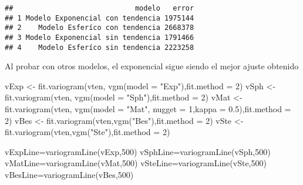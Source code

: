 \documentclass[
  12pt,
]{article}
\newenvironment{Shaded}{\begin{snugshade}}{\end{snugshade}}
\newcommand{\AttributeTok}[1]{\textcolor[rgb]{0.77,0.63,0.00}{#1}}
\newcommand{\DecValTok}[1]{\textcolor[rgb]{0.00,0.00,0.81}{#1}}
\newcommand{\FloatTok}[1]{\textcolor[rgb]{0.00,0.00,0.81}{#1}}
\newcommand{\FunctionTok}[1]{\textcolor[rgb]{0.00,0.00,0.00}{#1}}
\newcommand{\NormalTok}[1]{#1}
\newcommand{\OtherTok}[1]{\textcolor[rgb]{0.56,0.35,0.01}{#1}}
\newcommand{\StringTok}[1]{\textcolor[rgb]{0.31,0.60,0.02}{#1}}
\begin{document}
\begin{verbatim}
##                             modelo   error
## 1 Modelo Exponencial con tendencia 1975144
## 2    Modelo Esferíco con tendencia 2668378
## 3 Modelo Exponencial sin tendencia 1791466
## 4    Modelo Esferíco sin tendencia 2223258
\end{verbatim}

Al probar con otros modelos, el exponencial sigue siendo el mejor ajuste
obtenido

\begin{Shaded}
\begin{Highlighting}[]
\NormalTok{vExp }\OtherTok{\textless{}{-}} \FunctionTok{fit.variogram}\NormalTok{(vten, }\FunctionTok{vgm}\NormalTok{(}\AttributeTok{model =} \StringTok{"Exp"}\NormalTok{),}\AttributeTok{fit.method =} \DecValTok{2}\NormalTok{)}
\NormalTok{vSph }\OtherTok{\textless{}{-}} \FunctionTok{fit.variogram}\NormalTok{(vten, }\FunctionTok{vgm}\NormalTok{(}\AttributeTok{model =} \StringTok{"Sph"}\NormalTok{),}\AttributeTok{fit.method =} \DecValTok{2}\NormalTok{)}
\NormalTok{vMat }\OtherTok{\textless{}{-}} \FunctionTok{fit.variogram}\NormalTok{(vten, }\FunctionTok{vgm}\NormalTok{(}\AttributeTok{model =} \StringTok{"Mat"}\NormalTok{, }\AttributeTok{nugget =} \DecValTok{1}\NormalTok{,}\AttributeTok{kappa =} \FloatTok{0.5}\NormalTok{),}\AttributeTok{fit.method =} \DecValTok{2}\NormalTok{)}
\NormalTok{vBes }\OtherTok{\textless{}{-}} \FunctionTok{fit.variogram}\NormalTok{(vten,}\FunctionTok{vgm}\NormalTok{(}\StringTok{"Bes"}\NormalTok{),}\AttributeTok{fit.method =} \DecValTok{2}\NormalTok{)}
\NormalTok{vSte }\OtherTok{\textless{}{-}} \FunctionTok{fit.variogram}\NormalTok{(vten,}\FunctionTok{vgm}\NormalTok{(}\StringTok{"Ste"}\NormalTok{),}\AttributeTok{fit.method =} \DecValTok{2}\NormalTok{)}


\NormalTok{vExpLine}\OtherTok{=}\FunctionTok{variogramLine}\NormalTok{(vExp,}\DecValTok{500}\NormalTok{)}
\NormalTok{vSphLine}\OtherTok{=}\FunctionTok{variogramLine}\NormalTok{(vSph,}\DecValTok{500}\NormalTok{)}
\NormalTok{vMatLine}\OtherTok{=}\FunctionTok{variogramLine}\NormalTok{(vMat,}\DecValTok{500}\NormalTok{)}
\NormalTok{vSteLine}\OtherTok{=}\FunctionTok{variogramLine}\NormalTok{(vSte,}\DecValTok{500}\NormalTok{)}
\NormalTok{vBesLine}\OtherTok{=}\FunctionTok{variogramLine}\NormalTok{(vBes,}\DecValTok{500}\NormalTok{)}


\end{Highlighting}
\end{Shaded}
\end{document}
